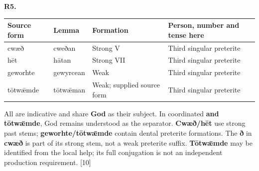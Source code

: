 \par\begin{minipage}{\linewidth}\raggedright
\textbf{R5.}

\par\begingroup
\fontsize{10.5}{13.2}\selectfont
\setlength{\LTleft}{0pt}\setlength{\LTright}{\fill}
\noindent
\begin{tabular}{@{}>{\raggedright\arraybackslash}p{21.15mm}>{\raggedright\arraybackslash}p{21.15mm}>{\raggedright\arraybackslash}p{35.21mm}>{\raggedright\arraybackslash}p{38.06mm}@{}}
\toprule
\textbf{Source form} & \textbf{Lemma} & \textbf{Formation} & \textbf{Person, number and tense here} \\
\midrule
cwæð & cweðan & Strong V & Third singular preterite \\
hēt & hātan & Strong VII & Third singular preterite \\
geworhte & gewyrcean & Weak & Third singular preterite \\
tōtwǣmde & tōtwǣman & Weak; supplied source form & Third singular preterite \\
\bottomrule
\end{tabular}
\par\endgroup

All are indicative and share \textbf{God} as their subject. In coordinated \textbf{and tōtwǣmde}, God remains understood as the separator. \textbf{Cwæð/\allowbreak{}hēt} use strong past stems; \textbf{geworhte/\allowbreak{}tōtwǣmde} contain dental preterite formations. The \textbf{ð} in \textbf{cwæð} is part of its strong stem, not a weak preterite suffix. \textbf{Tōtwǣmde} may be identified from the local help; its full conjugation is not an independent production requirement. [10]

\end{minipage}\par\addvspace{4pt}

